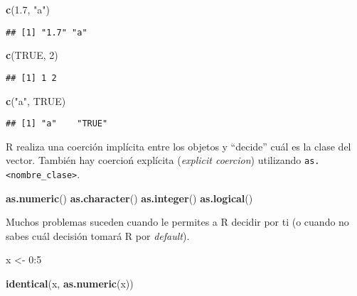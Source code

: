 \documentclass[]{article}
\newenvironment{Shaded}{\begin{snugshade}}{\end{snugshade}}
\newcommand{\KeywordTok}[1]{\textcolor[rgb]{0.13,0.29,0.53}{\textbf{{#1}}}}
\newcommand{\DecValTok}[1]{\textcolor[rgb]{0.00,0.00,0.81}{{#1}}}
\newcommand{\FloatTok}[1]{\textcolor[rgb]{0.00,0.00,0.81}{{#1}}}
\newcommand{\StringTok}[1]{\textcolor[rgb]{0.31,0.60,0.02}{{#1}}}
\newcommand{\OtherTok}[1]{\textcolor[rgb]{0.56,0.35,0.01}{{#1}}}
\newcommand{\NormalTok}[1]{{#1}}
\begin{document}
\begin{Shaded}
\begin{Highlighting}[]
\KeywordTok{c}\NormalTok{(}\FloatTok{1.7}\NormalTok{, }\StringTok{"a"}\NormalTok{)}
\end{Highlighting}
\end{Shaded}

\begin{verbatim}
## [1] "1.7" "a"
\end{verbatim}

\begin{Shaded}
\begin{Highlighting}[]
\KeywordTok{c}\NormalTok{(}\OtherTok{TRUE}\NormalTok{, }\DecValTok{2}\NormalTok{)}
\end{Highlighting}
\end{Shaded}

\begin{verbatim}
## [1] 1 2
\end{verbatim}

\begin{Shaded}
\begin{Highlighting}[]
\KeywordTok{c}\NormalTok{(}\StringTok{"a"}\NormalTok{, }\OtherTok{TRUE}\NormalTok{)}
\end{Highlighting}
\end{Shaded}

\begin{verbatim}
## [1] "a"    "TRUE"
\end{verbatim}

R realiza una coerción implícita entre los objetos y ``decide'' cuál es
la clase del vector. También hay coercioń explícita (\emph{explicit
coercion}) utilizando
\texttt{as.\textless{}nombre\_clase\textgreater{}}.

\begin{Shaded}
\begin{Highlighting}[]
\KeywordTok{as.numeric}\NormalTok{()}
\KeywordTok{as.character}\NormalTok{()}
\KeywordTok{as.integer}\NormalTok{()}
\KeywordTok{as.logical}\NormalTok{()}
\end{Highlighting}
\end{Shaded}

Muchos problemas suceden cuando le permites a R decidir por ti (o cuando
no sabes cuál decisión tomará R por \emph{default}).

\begin{Shaded}
\begin{Highlighting}[]
\NormalTok{x <-}\StringTok{ }\DecValTok{0}\NormalTok{:}\DecValTok{5}

\KeywordTok{identical}\NormalTok{(x, }\KeywordTok{as.numeric}\NormalTok{(x))}
\end{Highlighting}
\end{Shaded}
\end{document}
